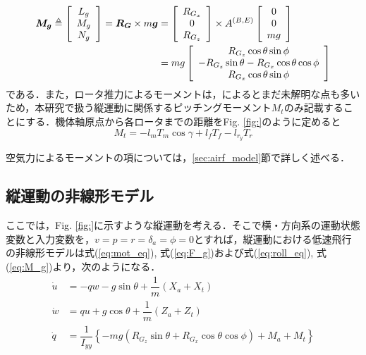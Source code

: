 \begin{equation}
  \begin{split}
    \mbox{\boldmath $M_g$} \triangleq
    \left[
    \begin{array}{ccc}
      L_g \\
      M_g \\
      N_g
    \end{array}
    \right] =
    \mbox{\boldmath $R_G$} \times
    m\mbox{\boldmath $g$} &=
    \left[
    \begin{array}{ccc}
      R_{G_x} \\
      0 \\
      R_{G_z}
    \end{array}
    \right] \times
    A^{(B,E)}
    \left[
    \begin{array}{ccc}
      0 \\
      0 \\
      mg
    \end{array}
    \right] \\
    &= mg
    \left[
    \begin{array}{ccc}
      R_{G_z}\cos\theta\sin\phi \\
      -R_{G_z}\sin\theta - R_{G_x}\cos\theta\cos\phi \\
      R_{G_x}\cos\theta\sin\phi
    \end{array}
    \right]
  \end{split}
  \label{eq:M_g}
\end{equation}
である．また，ロータ推力によるモーメントは，\cite{}によるとまだ未解明な点も多いため，本研究で扱う縦運動に関係するピッチングモーメント$M_t$のみ記載することにする．機体軸原点から各ロータまでの距離をFig. \ref{fig:}のように定めると
\begin{equation}
  M_t = -l_m T_m \cos\gamma + l_f T_f - l_{r_y} T_r
  \label{eq:M_t}
\end{equation}

空気力によるモーメントの項については，\ref{sec:airf_model}節で詳しく述べる．

\subsection{縦運動の非線形モデル}
\label{sec:lng_non_linear}

ここでは，Fig. \ref{fig:}に示すような縦運動を考える．そこで横・方向系の運動状態変数と入力変数を，$v=p=r=\delta_a=\phi=0$とすれば，縦運動における低速飛行の非線形モデルは式(\ref{eq:mot_eq}), 式(\ref{eq:F_g})および式(\ref{eq:roll_eq}), 式(\ref{eq:M_g})より，次のようになる．
\begin{align}
  \dot{u} &= -qw - g\sin\theta +\dfrac{1}{m}(X_a + X_t) \\
  \dot{w} &= qu + g\cos\theta +\dfrac{1}{m}(Z_a + Z_t) \\
  \dot{q} &= \dfrac{1}{I_{yy}}\left\{-mg(R_{G_z}\sin\theta+R_{G_x}\cos\theta\cos\phi) + M_a + M_t\right\}
\end{align}

